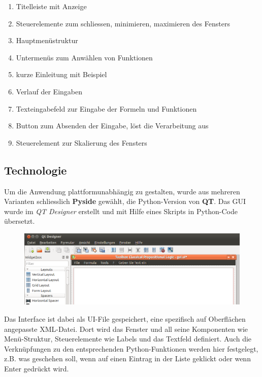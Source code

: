 \documentclass[11pt,a4paper,ngerman]{scrreprt}
\begin{document}
\begin{enumerate} 
\item Titelleiste mit Anzeige
\item Steuerelemente zum schliessen, minimieren, maximieren des Fensters
\item Hauptmenüstruktur
\item Untermenüs zum Anwählen von Funktionen
\item kurze Einleitung mit Beispiel
\item Verlauf der Eingaben
\item Texteingabefeld zur Eingabe der Formeln und Funktionen
\item Button zum Absenden der Eingabe, löst die Verarbeitung aus
\item Steuerelement zur Skalierung des Fensters
\end{enumerate}

\subsection{Technologie}
Um die Anwendung plattformunabhängig zu gestalten, wurde aus mehreren Varianten schliesslich \textbf{Pyside} gewählt, die Python-Version von \textbf{QT}. Das GUI wurde im \textit{QT Designer} erstellt und mit Hilfe eines Skripts in Python-Code übersetzt.
\begin{figure}[ht]
\centering
\includegraphics[width=.9\linewidth]{pics/designer.png}
\end{figure}
Das Interface ist dabei als UI-File gespeichert, eine spezifisch auf Oberflächen angepasste XML-Datei. Dort wird das Fenster und all seine Komponenten wie Menü-Struktur, Steuerelemente wie Labels und das Textfeld definiert. Auch die Verknüpfungen zu den entsprechenden Python-Funktionen werden hier festgelegt, z.B. was geschehen soll, wenn auf einen Eintrag in der Liste geklickt oder wenn Enter gedrückt wird.
\end{document}
